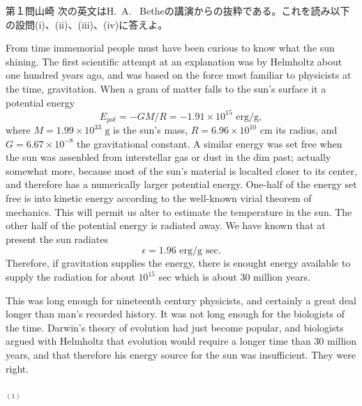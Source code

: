 \documentclass[fleqn]{jbook}
\begin{document}
\begin{question}{第１問}{山崎}
次の英文はH.~A. ~Betheの講演からの抜粋である。これを読み以下の設問(i)、(ii)、(iii)、(iv)に答えよ。

\bigskip

\qquad From time immemorial people must have been curious to know what  the sun shining. The first scientific attempt at an explanation was by Helmholtz about one hundred years ago, and was based on the force most familiar to physicists at the time, gravitation. When a gram of matter falls to the sun's surface it  a potential energy
\begin{equation}
E_{pot}=-GM/R=-1.91\times 10^{15} \textrm{ erg/g},
\end{equation}
where $M=1.99\times 10^{33} \text{ g}$ is the sun's mass, $R=6.96\times 10^{10}\text{ cm}$ its radius, and $G=6.67\times 10^{-8}$ the gravitational constant. A similar energy was set free when the sun was assenbled from interstellar gas or dust in the dim past; actually somewhat more, because most of the sun's material is localted closer to its center, and therefore has a numerically larger potential energy. One-half of the energy set free is  into kinetic energy according to the well-known virial theorem of mechanics. This will permit us alter to estimate the temperature in the sun. The other half of the potential energy is radiated away. We have known that at present the sun radiates
\begin{equation}
\epsilon=1.96 \text{ erg/g sec}.
\end{equation}
Therefore, if gravitation supplies the energy, there is enought energy available to supply the radiation for about $10^{15}$ sec which is about 30 million years.

\qquad This was long enough for nineteenth century physicists, and certainly a great deal longer than man's recorded history. It was not long enough for the biologists of the time. Darwin's theory of evolution had just become popular, and biologists argued with Helmholtz that evolution would require a longer time than 30 million years, and that therefore his energy source for the sun was insufficient. They were right.

\qquad $_{(1)}$


\end{question}
\end{document}
